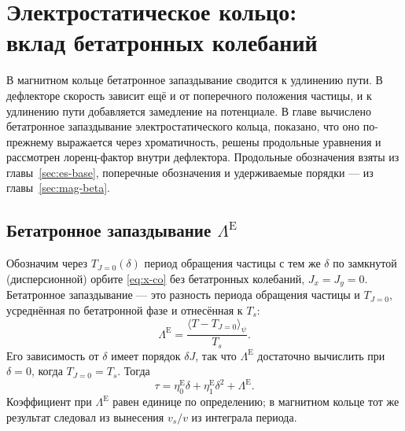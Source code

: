 \section[Электростатическое кольцо: вклад бетатронных колебаний]{Электростатическое кольцо:\\ вклад бетатронных колебаний}
\label{sec:es-beta}

В магнитном кольце бетатронное запаздывание сводится к удлинению пути. В дефлекторе скорость зависит ещё и от поперечного положения частицы, и к удлинению пути добавляется замедление на потенциале. В главе вычислено бетатронное запаздывание электростатического кольца, показано, что оно по-прежнему выражается через хроматичность, решены продольные уравнения и рассмотрен лоренц-фактор внутри дефлектора. Продольные обозначения взяты из главы~\ref{sec:es-base}, поперечные обозначения и удерживаемые порядки --- из главы~\ref{sec:mag-beta}.

\subsection{Бетатронное запаздывание $\Lambda^{\mathrm{E}}$}

Обозначим через $T_{J=0}(\delta)$ период обращения частицы с тем же $\delta$ по замкнутой (дисперсионной) орбите \eqref{eq:x-co} без бетатронных колебаний, $J_x=J_y=0$. Бетатронное запаздывание --- это разность периода обращения частицы и $T_{J=0}$, усреднённая по бетатронной фазе и отнесённая к $T_s$:
\begin{equation}
\label{eq:Lambda-def-es}
\Lambda^{\mathrm{E}}
=\frac{\langle T-T_{J=0}\rangle_\psi}{T_s}.
\end{equation}
Его зависимость от $\delta$ имеет порядок $\delta J$, так что $\Lambda^{\mathrm{E}}$ достаточно вычислить при $\delta=0$, когда $T_{J=0}=T_s$. Тогда
\begin{equation}
\label{eq:tau-es-L}
\tau=\eta_0^{\mathrm{E}}\delta+\eta_1^{\mathrm{E}}\delta^2+\Lambda^{\mathrm{E}}.
\end{equation}
Коэффициент при $\Lambda^{\mathrm{E}}$ равен единице по определению; в магнитном кольце тот же результат следовал из вынесения $v_s/v$ из интеграла периода.

